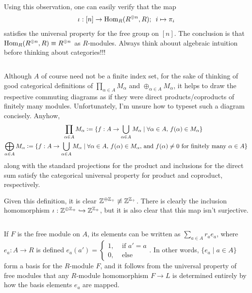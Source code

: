 \documentclass[12pt]{article}
\begin{document}
Using this observation, one can easily verify that the map 
$$\iota: [n] \rightarrow \text{Hom}_{R}(R^{\oplus n}, R); \hspace{0.5em} i \mapsto \pi_{i}$$ 
satisfies the universal property for the free group on $[n]$.
The conclusion is that $\homspace{R}{\rsum}{R} \equiv \rsum$ as $R$-modules. 
Always think abouut algebraic intuition before thinking about categories!!!

\subsection{} 
Although $A$ of course need not be a finite index set, for the sake of thinking of good categorical definitions of $\prod_{\alpha \in A} M_{\alpha}$ and $\oplus_{\alpha \in A} M_{\alpha}$, it helps to draw the respective commuting diagrams as if they were direct products/coproducts of finitely many modules.  
Unfortunately, I'm unsure how to typeset such a diagram concisely. 
Anyhow, 
\begin{align*}
  \prod_{\alpha \in A} M_\alpha \vcentcolon= \{f:A \rightarrow \bigcup_{\alpha \in A} M_\alpha & \mid \forall \alpha \in A, \, f(\alpha) \in M_\alpha\} \\ 
  \bigoplus_{\alpha \in A} M_\alpha \vcentcolon= \{f: A \rightarrow \bigcup_{\alpha \in A} M_\alpha \mid \forall \alpha \in A, \, f(\alpha) \in M_\alpha, & \text{ and } f(\alpha) \neq 0 \text{ for finitely many } \alpha \in A\}
\end{align*}
along with the standard projections for the product and inclusions for the direct sum satisfy the categorical universal property for product and coproduct, respectively. 

Given this definition, it is clear $\Z^{\oplus \Zpl} \not \equiv \Z^{\Zpl}$.
There is clearly the inclusion homomorphism $\iota: \mathbb{Z}^{\oplus \mathbb{Z}_{+}} \hookrightarrow \mathbb{Z}^{\mathbb{Z}_{+}}$, but it is also clear that this map isn't surjective. 

\setcounter{subsection}{8}
\subsection{} 
If $F$ is the free module on $A$, its elements can be written as $\sum_{a \in A} r_a e_a$, where $e_a: A \rightarrow R$ is defined $e_a(a') = \begin{cases} 1, & \text{ if } a' = a \\ 0, & \text{ else} \end{cases}$. 
In other words, $\{e_a \mid a \in A\}$ form a basis for the $R$-module $F$, and it follows from the universal property of free modules that any $R$-module homomorphism $F \rightarrow L$ is determined entirely by how the basis elements $e_a$ are mapped. 
\end{document}
